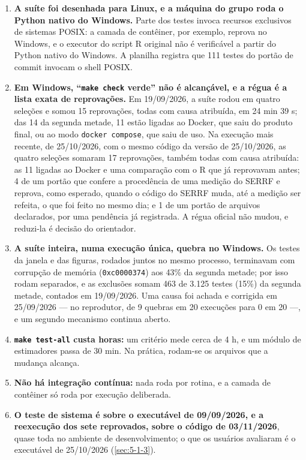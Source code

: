 \begin{enumerate}
\item \textbf{A suíte foi desenhada para Linux, e a máquina do grupo roda o Python nativo do Windows.} Parte dos testes invoca recursos exclusivos de sistemas POSIX: a camada de contêiner, por exemplo, reprova no Windows, e o executor do script R original não é verificável a partir do Python nativo do Windows. A planilha registra que 111 testes do portão de commit invocam o shell POSIX.
\item \textbf{Em Windows, ``\texttt{make check} verde'' não é alcançável, e a régua é a lista exata de reprovações.} Em 19/09/2026, a suíte rodou em quatro seleções e somou 15 reprovações, todas com causa atribuída, em 24 min 39 s; das 14 da segunda metade, 11 estão ligadas ao Docker, que saiu do produto final, ou ao modo \texttt{docker compose}, que saiu de uso. Na execução mais recente, de 25/10/2026, com o mesmo código da versão de 25/10/2026, as quatro seleções somaram 17 reprovações, também todas com causa atribuída: as 11 ligadas ao Docker e uma comparação com o R que já reprovavam antes; 4 de um portão que confere a procedência de uma medição do SERRF e reprova, como esperado, quando o código do SERRF muda, até a medição ser refeita, o que foi feito no mesmo dia; e 1 de um portão de arquivos declarados, por uma pendência já registrada. A régua oficial não mudou, e reduzi-la é decisão do orientador.
\item \textbf{A suíte inteira, numa execução única, quebra no Windows.} Os testes da janela e das figuras, rodados juntos no mesmo processo, terminavam com corrupção de memória (\texttt{0xc0000374}) aos 43\% da segunda metade; por isso rodam separados, e as exclusões somam 463 de 3.125 testes (15\%) da segunda metade, contados em 19/09/2026. Uma causa foi achada e corrigida em 25/09/2026 --- no reprodutor, de 9 quebras em 20 execuções para 0 em 20 ---, e um segundo mecanismo continua aberto.
\item \textbf{\texttt{make test-\allowbreak{}all} custa horas:} um critério mede cerca de 4 h, e um módulo de estimadores passa de 30 min. Na prática, rodam-se os arquivos que a mudança alcança.
\item \textbf{Não há integração contínua:} nada roda por rotina, e a camada de contêiner só roda por execução deliberada.
\item \textbf{O teste de sistema é sobre o executável de 09/09/2026, e a reexecução dos sete reprovados, sobre o código de 03/11/2026}, quase toda no ambiente de desenvolvimento; o que os usuários avaliaram é o executável de 25/10/2026 (\ref{sec:5-1-3}).

\end{enumerate}
